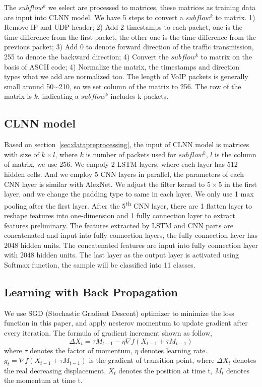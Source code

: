 \documentclass[conference]{IEEEtran}
\begin{document}
The $subflow^k$ we select are processed to matrices, these matrices as training data are input into CLNN model. We have 5 steps to convert a $subflow^k$ to matrix. 1) Remove IP and UDP header; 2) Add 2 timestamps to each packet, one is the time difference from the first packet, the other one is the time difference from the previous packet; 3) Add 0 to denote forward direction of the traffic transmission, 255 to denote the backward direction; 4) Convert the $subflow^k$ to matrix on the basis of ASCII code; 4) Normalize the matrix, the timestamps and direction types what we add are normalized too. The length of VoIP packets is generally small around 50$\sim$210, so we set column of the matrix to 256. The row of the matrix is $k$, indicating a $subflow^k$ includes k packets.

\subsection{CLNN model}
Based on section~\ref{sec:datapreprocessing}, the input of CLNN model is matrices with size of $k \times l$, where $k$ is number of packets used for $subflow^k$, $l$ is the column of matrix, we use 256. We empoly 2 LSTM layers, where each layer has 512 hidden cells. And we employ 5 CNN layers in parallel, the parameters of each CNN layer is similar with AlexNet. We adjust the filter kernel to $5 \times 5$ in the first layer, and we change the padding type to same in each layer. We only use 1 max pooling after the first layer. After the 5\textsuperscript{th} CNN layer, there are 1 flatten layer to reshape features into one-dimension and 1 fully connection layer to extract features preliminary. The features extracted by LSTM and CNN parts are concatenated and input into fully connection layers, the fully connection layer has 2048 hidden units. The concatenated features are input into fully connection layer with 2048 hidden units. The last layer as the output layer is activated using Softmax function, the sample will be classified into 11 classes.

\subsection{Learning with Back Propagation}
We use SGD (Stochastic Gradient Descent) optimizer to minimize the loss function in this paper, and apply nesterov momentum to update gradient after every iteration. The formula of gradient increment shown as follow,
\begin{equation}
\Delta {X_t} = \tau {M_{t - 1}} - \eta \nabla f({X_{t - 1}} + \tau {M_{t - 1}})
\end{equation}
where ${\tau}$ denotes the factor of momentum, ${\eta}$ denotes learning rate. ${g_t} = \nabla f({X_{t - 1}} + \tau {M_{t - 1}})$ is the gradient of transition point, where $\Delta {X_t}$ denotes the real decreasing displacement, ${X_t}$ denotes the position at time t, ${M_t}$ denotes the momentum at time t.
\end{document}
